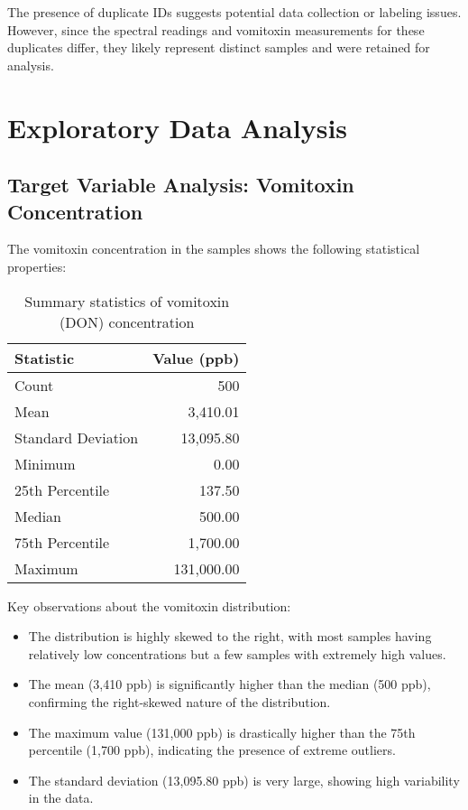 \documentclass[12pt,a4paper]{article}
\begin{document}
The presence of duplicate IDs suggests potential data collection or labeling issues. However, since the spectral readings and vomitoxin measurements for these duplicates differ, they likely represent distinct samples and were retained for analysis.

\section{Exploratory Data Analysis}

\subsection{Target Variable Analysis: Vomitoxin Concentration}

The vomitoxin concentration in the samples shows the following statistical properties:

\begin{table}[H]
\centering
\begin{tabular}{lr}
\toprule
\textbf{Statistic} & \textbf{Value (ppb)} \\
\midrule
Count & 500 \\
Mean & 3,410.01 \\
Standard Deviation & 13,095.80 \\
Minimum & 0.00 \\
25th Percentile & 137.50 \\
Median & 500.00 \\
75th Percentile & 1,700.00 \\
Maximum & 131,000.00 \\
\bottomrule
\end{tabular}
\caption{Summary statistics of vomitoxin (DON) concentration}
\end{table}

Key observations about the vomitoxin distribution:

\begin{itemize}
    \item The distribution is highly skewed to the right, with most samples having relatively low concentrations but a few samples with extremely high values.
    \item The mean (3,410 ppb) is significantly higher than the median (500 ppb), confirming the right-skewed nature of the distribution.
    \item The maximum value (131,000 ppb) is drastically higher than the 75th percentile (1,700 ppb), indicating the presence of extreme outliers.
    \item The standard deviation (13,095.80 ppb) is very large, showing high variability in the data.
\end{itemize}
\end{document}
